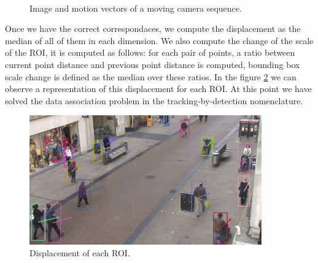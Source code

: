 \begin{figure}[H]
		
\centering

\\
\caption{Image and motion vectors of a moving camera sequence.}
\label{motion3}
\end{figure}


Once we have the correct correspondaces, we compute the displacement as the median of all of them in each dimension. We also compute the change of the scale of the ROI, it is computed as follows: for each pair of points, a ratio between current point distance and previous point distance is computed, bounding box scale change is defined as the median over these ratios. In the figure \ref{solution5} we can observe a representation of this displacement for each ROI. At this point we have solved the data association problem in the tracking-by-detection nomenclature.

\begin{figure}[H]
\centering         
\includegraphics[width=10cm]{intro/alcover2.png}
\caption{Displacement of each ROI.} \label{solution5}
\end{figure}


